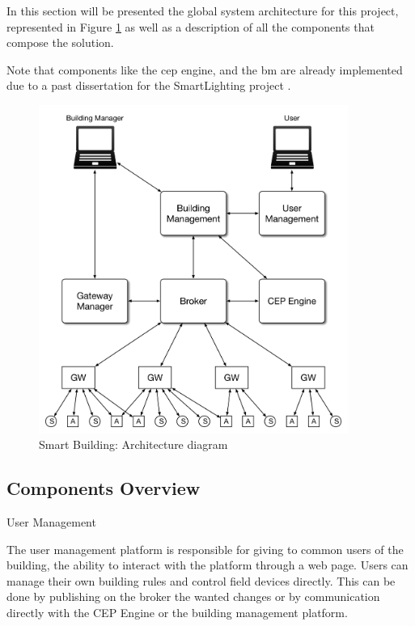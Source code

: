 In this section will be presented the global system architecture for this project, represented in Figure \ref{fig:arch} as well as a description of all the components that compose the solution.

Note that components like the \ac{cep} engine, and the \ac{bm} are already implemented due to a past dissertation for the SmartLighting project \cite{helder}.

\begin{figure}[H]
	\centering
	\includegraphics[width=0.9\textwidth]{figures/architecture.png}
	\caption{Smart Building: Architecture diagram}
	\label{fig:arch}
\end{figure}



\subsection{Components Overview}

\begin{Paragraph}{User Management}
	
	The user management platform is responsible for giving to common users of the building, the ability to interact with the platform through a web page. Users can manage their own building rules and control field devices directly. This can be done by publishing on the broker the wanted changes or by communication directly with the CEP Engine or the building management platform.
	
\end{Paragraph}

